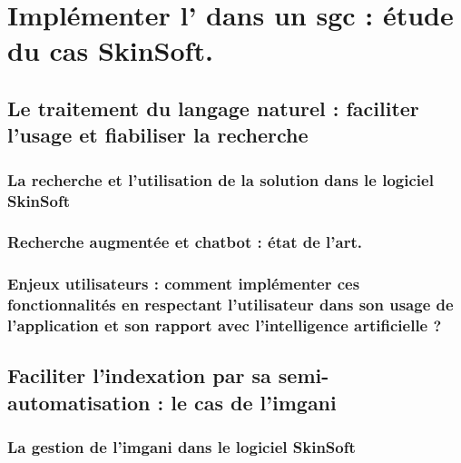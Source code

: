 \documentclass[12pt,twoside]{book}
\begin{document}
	\part{Implémenter l’ dans un \gls{sgc} : étude du cas SkinSoft.}
	
\chapter[\gls{NLP} et \gls{sgc}]{Le traitement du langage naturel : faciliter l’usage et fiabiliser la recherche}

\section[Recherche et usage : constat d'origine]{La recherche et l’utilisation de la solution dans le logiciel SkinSoft}


	
\newpage
	
\section{Recherche augmentée et \gls{chatbot} : état de l'art.}



\newpage

\section[Enjeux utilisateurs]{Enjeux utilisateurs : comment implémenter ces fonctionnalités en respectant l’utilisateur dans son usage de l’application et son rapport avec l’intelligence artificielle ? }	



\chapter[Traitement et indexation de l'\gls{imgani}]{Faciliter l’indexation par sa semi-automatisation : le cas de l’\gls{imgani}}

\section[Dans le logiciel Skinsoft]{La gestion de l’\gls{imgani} dans le logiciel SkinSoft}


\end{document}
